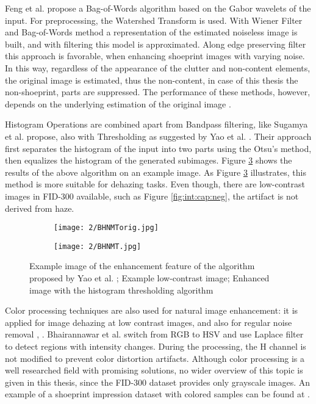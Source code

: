 \documentclass[draft,final]{vutinfth} %
\begin{document}
Feng et al. \cite{feng2011bag} propose a Bag-of-Words algorithm based on the Gabor wavelets of the input. 
For preprocessing, the Watershed Transform is used.
With Wiener Filter and Bag-of-Words method a representation of the estimated noiseless image is built, and with filtering this model is approximated.
Along edge preserving filter this approach is favorable, when enhancing shoeprint images with varying noise.
In this way, regardless of the appearance of the clutter and non-content elements, the original image is estimated, thus the non-content, in case of this thesis the non-shoeprint, parts are suppressed.
The performance of these methods, however, depends on the underlying estimation of the original image \cite{li2014rapid}.
\par
Histogram Operations are combined apart from Bandpass filtering, like Sugamya et al. \cite{sugamya2016image} propose, also with Thresholding as suggested by Yao et al. \cite{yao2016image}. 
Their approach first separates the histogram of the input into two parts using the Otsu's method, then equalizes the histogram of the generated subimages. 
Figure \ref{fig:rw:BHNMT} shows the results of the above algorithm on an example image.
As Figure \ref{fig:rw:BHNMT} illustrates, this method is more suitable for dehazing tasks. 
Even though, there are low-contrast images in FID-300 available, such as Figure \ref{fig:int:cap:neg}, the artifact is not derived from haze.

\begin{figure}[h]
  \centering
  \begin{subfigure}[t]{0.4\columnwidth}
    \centering
    \texttt{[image: 2/BHNMTorig.jpg]}
    \subcaption{}
    \label{fig:rw:BHNMTin}
  \end{subfigure}
  \begin{subfigure}[t]{0.4\columnwidth}
    \centering
    \texttt{[image: 2/BHNMT.jpg]}
    \subcaption{}
    \label{fig:rw:BHNMTout}
  \end{subfigure}
  \caption{Example image of the enhancement feature of the algorithm proposed by Yao et al. \cite{yao2016image};
			 Example low-contrast image;  Enhanced image with the histogram thresholding algorithm}
  \label{fig:rw:BHNMT} %
\end{figure}

\par
Color processing techniques are also used for natural image enhancement: it is applied for image dehazing at low contrast images, \cite{singh2018dehazing} and also for regular noise removal \cite{ren2018joint}, \cite{zhang2016simultaneous}. 
Bhairannawar et al. \cite{bhairannawar2017color} switch from RGB to HSV and use Laplace filter to detect regions with intensity changes. 
During the processing, the H channel is not modified to prevent color distortion artifacts.
Although color processing is a well researched field with promising solutions, no wider overview of this topic is given in this thesis, since the FID-300 dataset provides only grayscale images. 
An example of a shoeprint impression dataset with colored samples can be found at \cite{katireddy2017novel}. 
\end{document}
